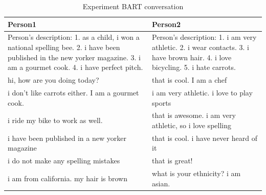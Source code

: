 \begin{table}[ht]
\centering
 \begin{tabular}{|p{7cm}|p{7cm}|} 
 \hline\hline
 \textbf{Person1} & \textbf{Person2} \\
 \hline\hline
 Person's description: 1. as a child, i won a national spelling bee. 2. i have been published in the new yorker magazine. 3. i am a gourmet cook. 4. i have perfect pitch. & Person's description: 1. i am very athletic. 2. i wear contacts. 3. i have brown hair. 4. i love bicycling. 5. i hate carrots. \\
 \hline
 hi, how are you doing today? & that is cool. I am a chef\\ 
 \hline
 i don't like carrots either. I am a gourmet cook.& i am very athletic. i love to play sports \\
 \hline
 i ride my bike to work as well. & that is awesome. i am very athletic, so i love spelling \\
 \hline 
 i have been published in a new yorker magazine & that is cool. i have never heard of it \\
 \hline
 i do not make any spelling mistakes & that is great! \\
 \hline 
 i am from california. my hair is brown & what is your ethnicity? i am asian. \\
 \hline\hline
 \end{tabular}
 \caption{Experiment BART conversation}
\label{tab:bart_conversation_ap}
\end{table}


